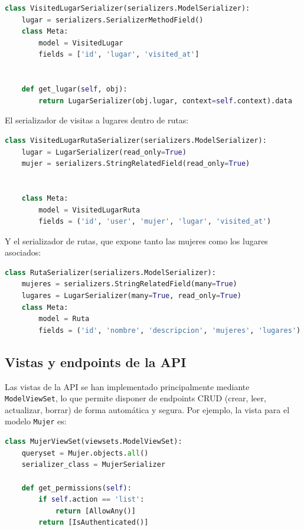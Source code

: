 \begin{lstlisting}[language=Python, caption={Serializador VisitedLugar}]
class VisitedLugarSerializer(serializers.ModelSerializer):
    lugar = serializers.SerializerMethodField()
    class Meta:
        model = VisitedLugar
        fields = ['id', 'lugar', 'visited_at']


    def get_lugar(self, obj):
        return LugarSerializer(obj.lugar, context=self.context).data
\end{lstlisting}


El serializador de visitas a lugares dentro de rutas:


\begin{lstlisting}[language=Python, caption={Serializador VisitedLugarRuta}]
class VisitedLugarRutaSerializer(serializers.ModelSerializer):
    lugar = LugarSerializer(read_only=True)
    mujer = serializers.StringRelatedField(read_only=True)


    class Meta:
        model = VisitedLugarRuta
        fields = ('id', 'user', 'mujer', 'lugar', 'visited_at')
\end{lstlisting}


Y el serializador de rutas, que expone tanto las mujeres como los lugares asociados:


\begin{lstlisting}[language=Python, caption={Serializador Ruta}]
class RutaSerializer(serializers.ModelSerializer):
    mujeres = serializers.StringRelatedField(many=True)
    lugares = LugarSerializer(many=True, read_only=True)
    class Meta:
        model = Ruta
        fields = ('id', 'nombre', 'descripcion', 'mujeres', 'lugares')
\end{lstlisting}


\subsection{Vistas y endpoints de la API}


Las vistas de la API se han implementado principalmente mediante \texttt{ModelViewSet}, lo que permite disponer de endpoints CRUD (crear, leer, actualizar, borrar) de forma automática y segura. Por ejemplo, la vista para el modelo \texttt{Mujer} es:


\begin{lstlisting}[language=Python, caption={Vista MujerViewSet con permisos condicionales}]
class MujerViewSet(viewsets.ModelViewSet):
    queryset = Mujer.objects.all()
    serializer_class = MujerSerializer

    def get_permissions(self):
        if self.action == 'list':
            return [AllowAny()]
        return [IsAuthenticated()]
\end{lstlisting}



